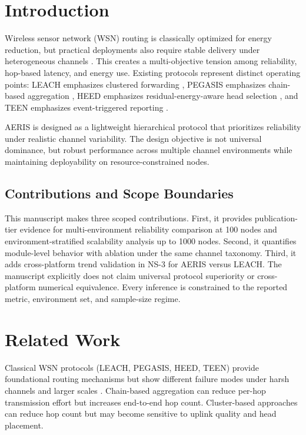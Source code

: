 ﻿\documentclass[sensors,article,submit,moreauthors,pdftex]{Definitions/mdpi}
\begin{document}
\section{Introduction}
Wireless sensor network (WSN) routing is classically optimized for energy reduction, but practical deployments also require stable delivery under heterogeneous channels \cite{Akyildiz2002Survey,Rault2016Energy}. This creates a multi-objective tension among reliability, hop-based latency, and energy use. Existing protocols represent distinct operating points: LEACH emphasizes clustered forwarding \cite{Heinzelman2000LEACH}, PEGASIS emphasizes chain-based aggregation \cite{Lindsey2002PEGASIS}, HEED emphasizes residual-energy-aware head selection \cite{Younis2004HEED}, and TEEN emphasizes event-triggered reporting \cite{Manjeshwar2001TEEN}.

AERIS is designed as a lightweight hierarchical protocol that prioritizes reliability under realistic channel variability. The design objective is not universal dominance, but robust performance across multiple channel environments while maintaining deployability on resource-constrained nodes.

\subsection*{Contributions and Scope Boundaries}
This manuscript makes three scoped contributions. First, it provides publication-tier evidence for multi-environment reliability comparison at 100 nodes and environment-stratified scalability analysis up to 1000 nodes. Second, it quantifies module-level behavior with ablation under the same channel taxonomy. Third, it adds cross-platform trend validation in NS-3 for AERIS versus LEACH. The manuscript explicitly does not claim universal protocol superiority or cross-platform numerical equivalence. Every inference is constrained to the reported metric, environment set, and sample-size regime.

\section{Related Work}
Classical WSN protocols (LEACH, PEGASIS, HEED, TEEN) provide foundational routing mechanisms but show different failure modes under harsh channels and larger scales \cite{Heinzelman2002LEACH,Lindsey2002PEGASIS,Younis2004HEED}. Chain-based aggregation can reduce per-hop transmission effort but increases end-to-end hop count. Cluster-based approaches can reduce hop count but may become sensitive to uplink quality and head placement.
\end{document}
